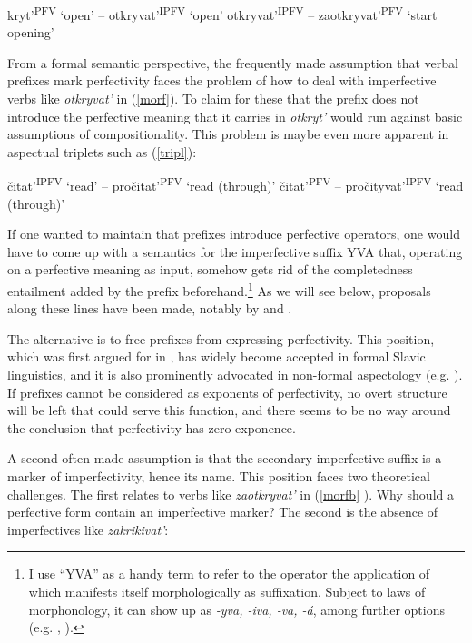 \documentclass[output=paper,colorlinks,citecolor=brown]{langscibook}
\begin{document}
\ea\label{morf}
kryt'\textsuperscript{PFV} `open' -- {ot}kryvat'\textsuperscript{IPFV} `open'\label{morfa}
\ex otkry{va}t'\textsuperscript{IPFV} -- zaotkry{va}t'\textsuperscript{PFV} `start opening'\label{morfb}
\z\z

\noindent From a formal semantic perspective, the frequently made assumption that verbal prefixes mark perfectivity faces the problem of how to deal with imperfective verbs like \textit{otkryvat'} in (\ref{morf}). To claim for these that the prefix does not introduce the perfective meaning that it carries in \textit{otkryt'} would run against basic assumptions of compositionality. 
This problem is maybe even more apparent in aspectual triplets such as (\ref{tripl}):

\ea\label{tripl}
\ea čitat'\textsuperscript{IPFV} `read' -- {pro}čitat'\textsuperscript{PFV} `read (through)'
čitat'\textsuperscript{PFV} -- {pro}čit{yva}t'\textsuperscript{IPFV} `read (through)'
\z\z

\largerpage
\noindent If one wanted to maintain that prefixes introduce perfective operators, one would have to come up with a semantics for the imperfective suffix YVA that, operating on a perfective meaning as input, somehow gets rid of the completedness entailment added by the prefix beforehand.\footnote{I use ``YVA'' as a handy term to refer to the operator the application of which manifests itself morphologically as suffixation. Subject to laws of morphonology, it can show up as \textit{-yva, -iva, -va, -\'a}, among further options (e.g. \citealt{Svedova1980}, \citealt{zaliznjaksmelev97}).} As we will see below, proposals along these lines have been made, notably by \citet{Zucchi1999} and \citet{Gronn2004}. 

The alternative is to free prefixes from expressing perfectivity. 
This position, which was first argued for in \citet{Filip92}, has widely become accepted in formal Slavic linguistics, and it is also prominently advocated in non-formal aspectology (e.g. \citealt{Plungjan11}).
If prefixes cannot be considered as exponents of perfectivity, no overt structure will be left that could serve this function, and there seems to be no way around the conclusion that perfectivity has zero exponence. 

A second often made assumption is that the secondary imperfective suffix 
is a marker of imperfectivity, hence its name. This position faces two theoretical challenges. The first relates to verbs like \textit{zaotkryvat'} in (\ref{morfb}%
). Why should a perfective form contain an imperfective marker? The second is the absence of imperfectives like \textit{zakrikivat'}: 
\end{document}
